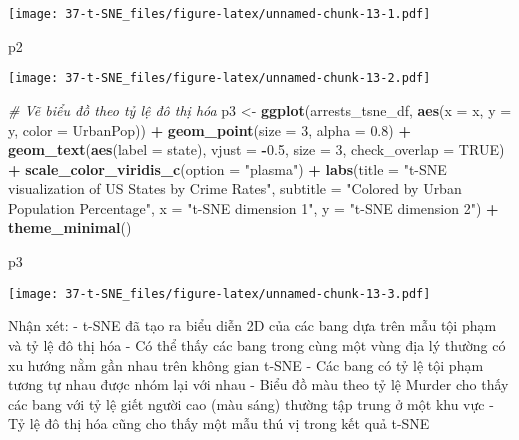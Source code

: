 \documentclass[
]{article}
\newenvironment{Shaded}{\begin{snugshade}}{\end{snugshade}}
\newcommand{\AttributeTok}[1]{\textcolor[rgb]{0.13,0.29,0.53}{#1}}
\newcommand{\CommentTok}[1]{\textcolor[rgb]{0.56,0.35,0.01}{\textit{#1}}}
\newcommand{\ConstantTok}[1]{\textcolor[rgb]{0.56,0.35,0.01}{#1}}
\newcommand{\DecValTok}[1]{\textcolor[rgb]{0.00,0.00,0.81}{#1}}
\newcommand{\FloatTok}[1]{\textcolor[rgb]{0.00,0.00,0.81}{#1}}
\newcommand{\FunctionTok}[1]{\textcolor[rgb]{0.13,0.29,0.53}{\textbf{#1}}}
\newcommand{\NormalTok}[1]{#1}
\newcommand{\OtherTok}[1]{\textcolor[rgb]{0.56,0.35,0.01}{#1}}
\newcommand{\SpecialCharTok}[1]{\textcolor[rgb]{0.81,0.36,0.00}{\textbf{#1}}}
\newcommand{\StringTok}[1]{\textcolor[rgb]{0.31,0.60,0.02}{#1}}
\begin{document}
\texttt{[image: 37-t-SNE\_files/figure-latex/unnamed-chunk-13-1.pdf]}

\begin{Shaded}
\begin{Highlighting}[]
\NormalTok{p2}
\end{Highlighting}
\end{Shaded}

\texttt{[image: 37-t-SNE\_files/figure-latex/unnamed-chunk-13-2.pdf]}

\begin{Shaded}
\begin{Highlighting}[]
\CommentTok{\# Vẽ biểu đồ theo tỷ lệ đô thị hóa}
\NormalTok{p3 }\OtherTok{\textless{}{-}} \FunctionTok{ggplot}\NormalTok{(arrests\_tsne\_df, }\FunctionTok{aes}\NormalTok{(}\AttributeTok{x =}\NormalTok{ x, }\AttributeTok{y =}\NormalTok{ y, }\AttributeTok{color =}\NormalTok{ UrbanPop)) }\SpecialCharTok{+}
  \FunctionTok{geom\_point}\NormalTok{(}\AttributeTok{size =} \DecValTok{3}\NormalTok{, }\AttributeTok{alpha =} \FloatTok{0.8}\NormalTok{) }\SpecialCharTok{+}
  \FunctionTok{geom\_text}\NormalTok{(}\FunctionTok{aes}\NormalTok{(}\AttributeTok{label =}\NormalTok{ state), }\AttributeTok{vjust =} \SpecialCharTok{{-}}\FloatTok{0.5}\NormalTok{, }\AttributeTok{size =} \DecValTok{3}\NormalTok{, }\AttributeTok{check\_overlap =} \ConstantTok{TRUE}\NormalTok{) }\SpecialCharTok{+}
  \FunctionTok{scale\_color\_viridis\_c}\NormalTok{(}\AttributeTok{option =} \StringTok{"plasma"}\NormalTok{) }\SpecialCharTok{+}
  \FunctionTok{labs}\NormalTok{(}\AttributeTok{title =} \StringTok{"t{-}SNE visualization of US States by Crime Rates"}\NormalTok{,}
       \AttributeTok{subtitle =} \StringTok{"Colored by Urban Population Percentage"}\NormalTok{,}
       \AttributeTok{x =} \StringTok{"t{-}SNE dimension 1"}\NormalTok{,}
       \AttributeTok{y =} \StringTok{"t{-}SNE dimension 2"}\NormalTok{) }\SpecialCharTok{+}
  \FunctionTok{theme\_minimal}\NormalTok{()}

\NormalTok{p3}
\end{Highlighting}
\end{Shaded}

\texttt{[image: 37-t-SNE\_files/figure-latex/unnamed-chunk-13-3.pdf]}

Nhận xét: - t-SNE đã tạo ra biểu diễn 2D của các bang dựa trên mẫu tội
phạm và tỷ lệ đô thị hóa - Có thể thấy các bang trong cùng một vùng địa
lý thường có xu hướng nằm gần nhau trên không gian t-SNE - Các bang có
tỷ lệ tội phạm tương tự nhau được nhóm lại với nhau - Biểu đồ màu theo
tỷ lệ Murder cho thấy các bang với tỷ lệ giết người cao (màu sáng)
thường tập trung ở một khu vực - Tỷ lệ đô thị hóa cũng cho thấy một mẫu
thú vị trong kết quả t-SNE
\end{document}
